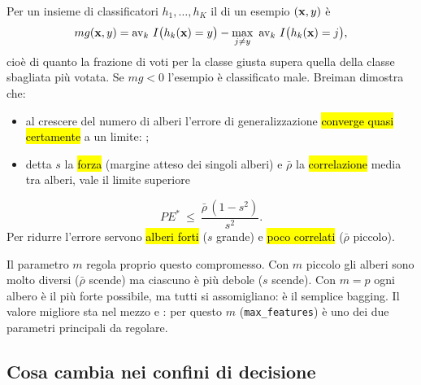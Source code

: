 \begin{tecnica}
Per un insieme di classificatori $h_1,\dots,h_K$ il  di un esempio $(\mathbf{x},y)$ è
\[
mg(\mathbf{x},y)=\operatorname{av}_k\,I\big(h_k(\mathbf{x})=y\big)-\max_{j\ne y}\ \operatorname{av}_k\,I\big(h_k(\mathbf{x})=j\big),
\]
cioè di quanto la frazione di voti per la classe giusta supera quella della classe sbagliata più votata. Se $mg<0$ l'esempio è classificato male. Breiman dimostra che:
\begin{itemize}
  \item al crescere del numero di alberi l'errore di generalizzazione \hl{converge quasi certamente} a un limite: ;
  \item detta $s$ la \hl{forza} (margine atteso dei singoli alberi) e $\bar\rho$ la \hl{correlazione} media tra alberi, vale il limite superiore
\end{itemize}
\[
PE^*\ \le\ \frac{\bar\rho\,(1-s^2)}{s^2}.
\]
Per ridurre l'errore servono \hl{alberi forti} ($s$ grande) e \hl{poco correlati} ($\bar\rho$ piccolo).
\end{tecnica}

\begin{intuizione}[Il compromesso su $m$]
Il parametro $m$ regola proprio questo compromesso. Con $m$ piccolo gli alberi sono molto diversi ($\bar\rho$ scende) ma ciascuno è più debole ($s$ scende). Con $m=p$ ogni albero è il più forte possibile, ma tutti si assomigliano: è il semplice bagging. Il valore migliore sta nel mezzo e : per questo $m$ (\texttt{max\_features}) è uno dei due parametri principali da regolare.
\end{intuizione}

\subsection{Cosa cambia nei confini di decisione}

\par\noindent\begin{minipage}{\linewidth}
\end{minipage}\par

